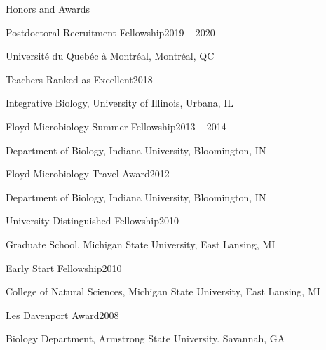 \documentclass{resume} %
\begin{document}
\begin{rSection}{Honors and Awards}

    \begin{rSubsection}{Postdoctoral Recruitment Fellowship}{2019 -- 2020}{}{}
      \item Universit\'{e} du Queb\'{e}c \`{a} Montr\'{e}al, Montr\'{e}al, QC
    \end{rSubsection}

    \begin{rSubsection}{Teachers Ranked as Excellent}{2018}{}{}
      \item Integrative Biology, University of Illinois, Urbana, IL
    \end{rSubsection}

    \begin{rSubsection}{Floyd Microbiology Summer Fellowship}{2013 -- 2014}{}{}
      \item Department of Biology, Indiana University, Bloomington, IN
    \end{rSubsection}

    \begin{rSubsection}{Floyd Microbiology Travel Award}{2012}{}{}
      \item Department of Biology, Indiana University, Bloomington, IN
    \end{rSubsection}

    \begin{rSubsection}{University Distinguished Fellowship}{2010}{}{}
      \item Graduate School, Michigan State University, East Lansing, MI
    \end{rSubsection}

    \begin{rSubsection}{Early Start Fellowship}{2010}{}{}
      \item College of Natural Sciences, Michigan State University, East
      Lansing, MI
    \end{rSubsection}

    \begin{rSubsection}{Les Davenport Award}{2008}{}{}
      \item Biology Department, Armstrong State University. Savannah, GA
    \end{rSubsection}


\end{rSection}
\end{document}
